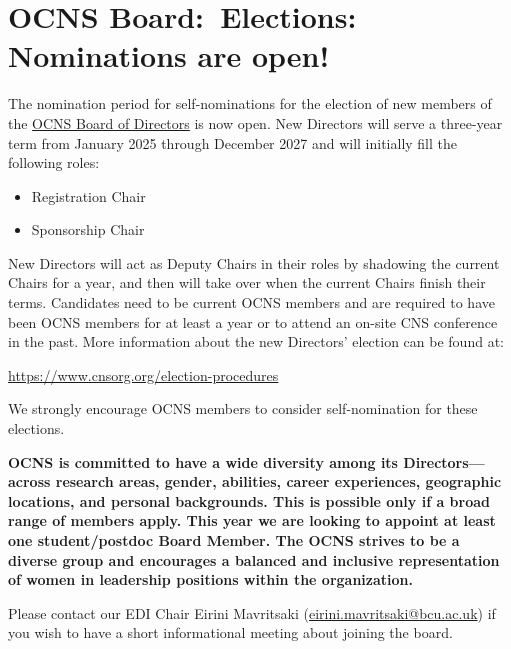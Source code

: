 \documentclass[11pt,a4paper,oneside]{article}
\begin{document}
\section*{OCNS Board:\ Elections: Nominations are open!}%
\sectionauthor{\vspace{-4ex}}
The nomination period for self-nominations for the election of new members of the \href{}{OCNS Board of Directors} is now open.
New Directors will serve a three-year term from January 2025 through December 2027 and will initially fill the following roles:
\begin{multicols}{2}
  \begin{itemize}
    \item Registration Chair
    \item Sponsorship Chair
  \end{itemize}
\end{multicols}

New Directors will act as Deputy Chairs in their roles by shadowing the current Chairs for a year, and then will take over when the current Chairs finish their terms.
Candidates need to be current OCNS members and are required to have been OCNS members for at least a year or to attend an on-site CNS conference in the past.
More information about the new Directors' election can be found at:

\begin{center}
\url{https://www.cnsorg.org/election-procedures}
\end{center}


We strongly encourage OCNS members to consider self-nomination for these elections.

\begin{tcolorbox}[colback=CornflowerBlue, colframe=black, width=\textwidth, boxrule=0.1mm]
\textbf{OCNS is committed to have a wide diversity among its Directors---across research areas, gender, abilities, career experiences, geographic locations, and personal backgrounds.
This is possible only if a broad range of members apply.
This year we are looking to appoint at least one student/postdoc Board Member.
The OCNS strives to be a diverse group and encourages a balanced and inclusive representation of women in leadership positions within the organization.}
\end{tcolorbox}

Please contact our EDI Chair Eirini Mavritsaki (\href{mailto:eirini.mavritsaki@bcu.ac.uk}{eirini.mavritsaki@bcu.ac.uk}) if you wish to have a short informational meeting about joining the board.
\end{document}
